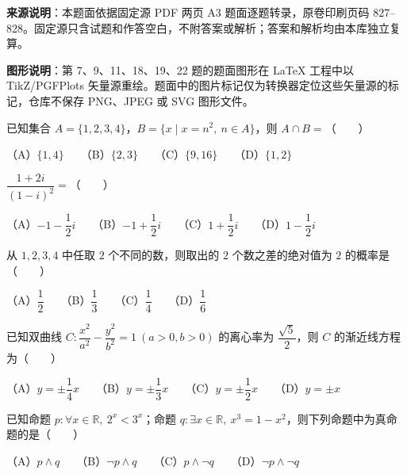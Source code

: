 


\begin{gktip}
\textbf{来源说明}：本题面依据固定源 PDF 两页 A3 题面逐题转录，原卷印刷页码 827–828。固定源只含试题和作答空白，不附答案或解析；答案和解析均由本库独立复算。

\textbf{图形说明}：第 7、9、11、18、19、22 题的题面图形在 LaTeX 工程中以 TikZ/PGFPlots 矢量源重绘。题面中的图片标记仅为转换器定位这些矢量源的标记，仓库不保存 PNG、JPEG 或 SVG 图形文件。
\end{gktip}


\begin{question}
已知集合 $A=\{1,2,3,4\}$，$B=\{x\mid x=n^2,\ n\in A\}$，则 $A\cap B=$\mbox{（　　）}

（A）$\{1,4\}$　　（B）$\{2,3\}$　　（C）$\{9,16\}$　　（D）$\{1,2\}$

\end{question}
\begin{question}
$\dfrac{1+2i}{(1-i)^2}=$\mbox{（　　）}

（A）$-1-\dfrac12i$　　（B）$-1+\dfrac12i$　　（C）$1+\dfrac12i$　　（D）$1-\dfrac12i$

\end{question}
\begin{question}
从 $1,2,3,4$ 中任取 $2$ 个不同的数，则取出的 $2$ 个数之差的绝对值为 $2$ 的概率是\mbox{（　　）}

（A）$\dfrac12$　　（B）$\dfrac13$　　（C）$\dfrac14$　　（D）$\dfrac16$

\end{question}
\begin{question}
已知双曲线 $C:\dfrac{x^2}{a^2}-\dfrac{y^2}{b^2}=1\ (a>0,b>0)$ 的离心率为 $\dfrac{\sqrt5}{2}$，则 $C$ 的渐近线方程为\mbox{（　　）}

（A）$y=\pm\dfrac14x$　　（B）$y=\pm\dfrac13x$　　（C）$y=\pm\dfrac12x$　　（D）$y=\pm x$

\end{question}
\begin{question}
已知命题 $p:\forall x\in\mathbb R,\ 2^x<3^x$；命题 $q:\exists x\in\mathbb R,\ x^3=1-x^2$，则下列命题中为真命题的是\mbox{（　　）}

（A）$p\land q$　　（B）$\neg p\land q$　　（C）$p\land\neg q$　　（D）$\neg p\land\neg q$

\end{question}

